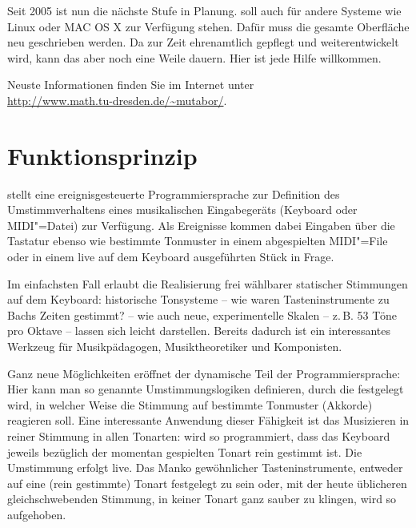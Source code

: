 Seit 2005 ist nun die nächste Stufe in Planung. \mutabor{} soll auch
für andere Systeme wie Linux oder MAC OS X zur Verfügung stehen. Dafür
muss die gesamte Oberfläche neu geschrieben werden. Da \mutabor{} zur
Zeit ehrenamtlich gepflegt und weiterentwickelt wird, kann das aber
noch eine Weile dauern. Hier ist jede Hilfe willkommen.

\begin{center}
Neuste Informationen finden Sie im Internet unter\\
{\url{http://www.math.tu-dresden.de/~mutabor/}}.
\end{center}



\section{Funktionsprinzip}

\mutabor{} stellt eine ereignisgesteuerte Programmiersprache zur
Definition des Umstimmverhaltens eines musikalischen Eingabegeräts
(Keyboard oder MIDI"=Datei) zur Verfügung. Als Ereignisse kommen dabei
Eingaben über die Tastatur ebenso wie bestimmte Tonmuster in einem
abgespielten MIDI"=File oder in einem live auf dem Keyboard
ausgeführten Stück in Frage.

Im einfachsten Fall erlaubt \mutabor{} die Realisierung frei wählbarer
statischer Stimmungen auf dem Keyboard: historische Tonsysteme -- wie
waren Tasteninstrumente zu Bachs Zeiten gestimmt? -- wie auch neue,
experimentelle Skalen -- z.\,B. 53 Töne pro Oktave -- lassen sich
leicht darstellen. Bereits dadurch ist \mutabor{} ein interessantes
Werkzeug für Musikpädagogen, Musiktheoretiker und Komponisten.

Ganz neue Möglichkeiten eröffnet der dynamische Teil der
Programmiersprache: Hier kann man so genannte Umstimmungslogiken
definieren, durch die festgelegt wird, in welcher Weise die Stimmung
auf bestimmte Tonmuster (Akkorde) reagieren soll.  Eine interessante
Anwendung dieser Fähigkeit ist das Musizieren in reiner Stimmung in
allen Tonarten: \mutabor{} wird so programmiert, dass das Keyboard
jeweils bezüglich der momentan gespielten Tonart rein gestimmt ist.
Die Umstimmung erfolgt live. Das Manko gewöhnlicher Tasteninstrumente,
entweder auf eine (rein gestimmte) Tonart festgelegt zu sein oder, mit
der heute üblicheren gleichschwebenden Stimmung, in keiner Tonart ganz
sauber zu klingen, wird so aufgehoben.

